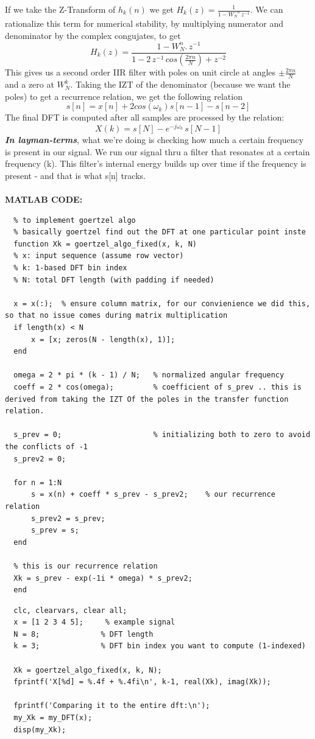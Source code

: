 \documentclass[12pt]{report}
\begin{document}
  If we take the Z-Transform of $ h_k (n) $ we get $ H_k (z) = \frac{1}{1 - W_{N}^{-n} \, z^{-1}} $. We can rationalize this term for numerical stability, by multiplying numerator and denominator by the complex congujates, to get \[ H_k (z) = \frac{1 - W_{N}^{n} . \, z^{-1}}{1 - 2 \, z^{-1} \, cos \left( \frac{2 \pi n}{N} \right) + z^{-2}} \] This gives us a second order IIR filter with poles on unit circle at angles $ \pm \frac{2 \pi n}{N} $ and a zero at $ W_{N}^{k} $. Taking the IZT of the denominator (because we want the poles) to get a recurrence relation, we get the following relation \[ s[n] = x[n] + 2 cos(\omega_k) s[n-1] - s[n-2] \] The final DFT is computed after all samples are processed by the relation: \[ X(k) = s[N] - e^{-j \omega_k} \, s[N - 1] \] \textbf{\textit{In layman-terms}}, what we're doing is checking how much a certain frequency is present in our signal. We run our signal thru a filter that resonates at a certain frequency (k). This filter's internal energy builds up over time if the frequency is present - and that is what s[n] tracks. \cite{profnotes} \\ \\ 
  \textbf{MATLAB CODE:}
  \begin{lstlisting}
  % to implement goertzel algo
  % basically goertzel find out the DFT at one particular point inste
  function Xk = goertzel_algo_fixed(x, k, N)
  % x: input sequence (assume row vector)
  % k: 1-based DFT bin index
  % N: total DFT length (with padding if needed)

  x = x(:);  % ensure column matrix, for our convienience we did this, so that no issue comes during matrix multiplication
  if length(x) < N
      x = [x; zeros(N - length(x), 1)];
  end

  omega = 2 * pi * (k - 1) / N;   % normalized angular frequency
  coeff = 2 * cos(omega);         % coefficient of s_prev .. this is derived from taking the IZT Of the poles in the transfer function relation.

  s_prev = 0;                     % initializing both to zero to avoid the conflicts of -1
  s_prev2 = 0;

  for n = 1:N
      s = x(n) + coeff * s_prev - s_prev2;    % our recurrence relation
      s_prev2 = s_prev;
      s_prev = s;
  end
  
  % this is our recurrence relation
  Xk = s_prev - exp(-1i * omega) * s_prev2;
  end
  \end{lstlisting}
  \begin{lstlisting}
  clc, clearvars, clear all;
  x = [1 2 3 4 5];     % example signal
  N = 8;              % DFT length
  k = 3;              % DFT bin index you want to compute (1-indexed)

  Xk = goertzel_algo_fixed(x, k, N);
  fprintf('X[%d] = %.4f + %.4fi\n', k-1, real(Xk), imag(Xk));

  fprintf('Comparing it to the entire dft:\n');
  my_Xk = my_DFT(x);
  disp(my_Xk);
  \end{lstlisting}
\end{document}
